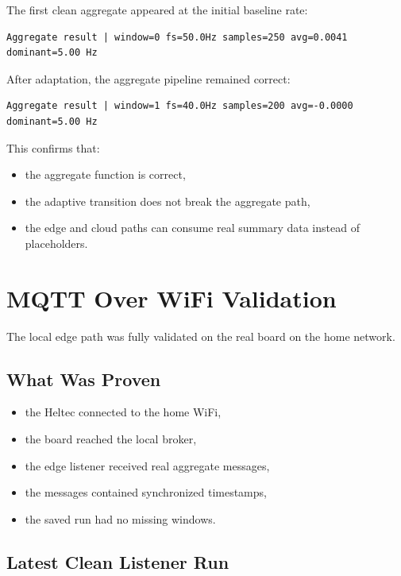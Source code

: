 \documentclass[12pt,a4paper]{article}
\begin{document}
The first clean aggregate appeared at the initial baseline rate:

\begin{lstlisting}
Aggregate result | window=0 fs=50.0Hz samples=250 avg=0.0041 dominant=5.00 Hz
\end{lstlisting}

After adaptation, the aggregate pipeline remained correct:

\begin{lstlisting}
Aggregate result | window=1 fs=40.0Hz samples=200 avg=-0.0000 dominant=5.00 Hz
\end{lstlisting}

This confirms that:

\begin{itemize}
    \item the aggregate function is correct,
    \item the adaptive transition does not break the aggregate path,
    \item the edge and cloud paths can consume real summary data instead of placeholders.
\end{itemize}

\section{MQTT Over WiFi Validation}

The local edge path was fully validated on the real board on the home network.

\subsection{What Was Proven}

\begin{itemize}
    \item the Heltec connected to the home WiFi,
    \item the board reached the local broker,
    \item the edge listener received real aggregate messages,
    \item the messages contained synchronized timestamps,
    \item the saved run had no missing windows.
\end{itemize}

\subsection{Latest Clean Listener Run}
\end{document}
